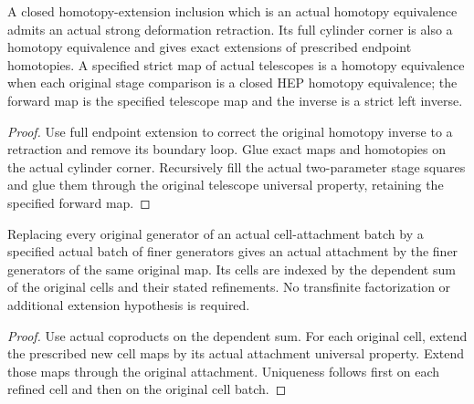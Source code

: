 \begin{proposition}
  \label{prop:actual-closed-hep-telescope-map-equivalences}
  \leanok
  A closed homotopy-extension inclusion which is an actual homotopy equivalence admits an actual strong deformation retraction. Its full cylinder corner is also a homotopy equivalence and gives exact extensions of prescribed endpoint homotopies. A specified strict map of actual telescopes is a homotopy equivalence when each original stage comparison is a closed HEP homotopy equivalence; the forward map is the specified telescope map and the inverse is a strict left inverse.
\end{proposition}
\begin{proof}
  Use full endpoint extension to correct the original homotopy inverse to a retraction and remove its boundary loop. Glue exact maps and homotopies on the actual cylinder corner. Recursively fill the actual two-parameter stage squares and glue them through the original telescope universal property, retaining the specified forward map.
  \leanok
\end{proof}

\begin{proposition}
  \label{prop:actual-cell-attachment-refinement}
  \leanok
  Replacing every original generator of an actual cell-attachment batch by a specified actual batch of finer generators gives an actual attachment by the finer generators of the same original map. Its cells are indexed by the dependent sum of the original cells and their stated refinements. No transfinite factorization or additional extension hypothesis is required.
\end{proposition}
\begin{proof}
  Use actual coproducts on the dependent sum. For each original cell, extend the prescribed new cell maps by its actual attachment universal property. Extend those maps through the original attachment. Uniqueness follows first on each refined cell and then on the original cell batch.
  \leanok
\end{proof}

